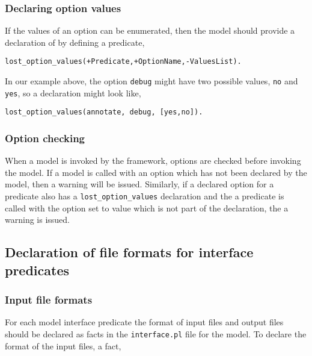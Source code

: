 \documentclass{book}
\begin{document}
\subsubsection{Declaring option values}

If the values of an option can be enumerated, then the model should
provide a declaration of by defining a predicate, 
\begin{verbatim}
lost_option_values(+Predicate,+OptionName,-ValuesList).
\end{verbatim}

In our example above, the option \texttt{debug} might have two
possible values, \texttt{no} and \texttt{yes}, so a declaration might
look like, 
\begin{verbatim}
lost_option_values(annotate, debug, [yes,no]).
\end{verbatim}

\subsubsection{Option checking}

When a model is invoked by the framework, options are checked before 
invoking the model. If a model is called with an option which has not
been declared by the model, then a warning will be issued. Similarly, 
if a declared option for a predicate also has a
\texttt{lost\_option\_values} declaration and the a predicate is called
with the option set to value which is not part of the declaration, the a warning is issued. 

\subsection{Declaration of file formats for interface predicates}


\subsubsection{Input file formats}

For each model interface predicate the format of input files and
output files should be declared as facts in the \texttt{interface.pl} file for the model.
To declare the format of the input files, a fact, 
\end{document}
